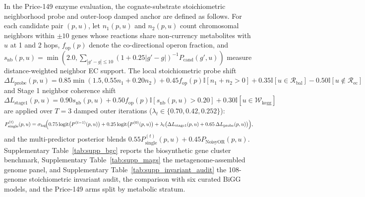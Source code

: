 \documentclass[10pt]{article}
\begin{document}
In the Price-149 enzyme evaluation, the cognate-substrate stoichiometric neighborhood probe and outer-loop damped anchor are defined as follows. For each candidate pair $(p, u)$, let $n_1(p, u)$ and $n_2(p, u)$ count chromosomal neighbors within $\pm 10$ genes whose reactions share non-currency metabolites with $u$ at 1 and 2 hops, $f_{\text{op}}(p)$ denote the co-directional operon fraction, and $s_{\text{nb}}(p, u) = \min(2.0, \sum_{|g' - g| \le 10} (1 + 0.25|g' - g|)^{-1} P_{\text{cand}}(g', u))$ measure distance-weighted neighbor EC support. The local stoichiometric probe shift $\Delta L_{\text{probe}}(p, u) = 0.85 \min(1.5, 0.55 n_1 + 0.20 n_2) + 0.45 f_{\text{op}}(p)\mathbb{I}[n_1 + n_2 > 0] + 0.35\mathbb{I}[u \in \mathcal{R}_{\text{bal}}] - 0.50\mathbb{I}[u \notin \mathcal{R}_{\text{ec}}]$ and Stage 1 neighbor coherence shift $\Delta L_{\text{stage1}}(p, u) = 0.90 s_{\text{nb}}(p, u) + 0.50 f_{\text{op}}(p)\mathbb{I}[s_{\text{nb}}(p, u) > 0.20] + 0.30\mathbb{I}[u \in \mathcal{W}_{\text{kegg}}]$ are applied over $T=3$ damped outer iterations ($\lambda_t \in \{0.70, 0.42, 0.252\}$):
\begin{equation}
  P_{\text{single}}^{(t)}(p, u) = \sigma_{\text{log}}\!\Bigl(0.75 \, \text{logit}\bigl(P^{(t-1)}(p, u)\bigr) + 0.25 \, \text{logit}\bigl(P^{(0)}(p, u)\bigr) + \lambda_t \bigl(\Delta L_{\text{stage1}}(p, u) + 0.65\,\Delta L_{\text{probe}}(p, u)\bigr)\Bigr),
  \label{eq:supp_outer_anchor}
\end{equation}
and the multi-predictor posterior blends $0.55 P_{\text{single}}^{(t)}(p, u) + 0.45 P_{\text{NoisyOR}}(p, u)$. Supplementary Table~\ref{tab:supp_bgc} reports the biosynthetic gene cluster benchmark, Supplementary Table~\ref{tab:supp_mags} the metagenome-assembled genome panel, and Supplementary Table~\ref{tab:supp_invariant_audit} the 108-genome stoichiometric invariant audit, the comparison with six curated BiGG models, and the Price-149 arms split by metabolic stratum.
\end{document}
